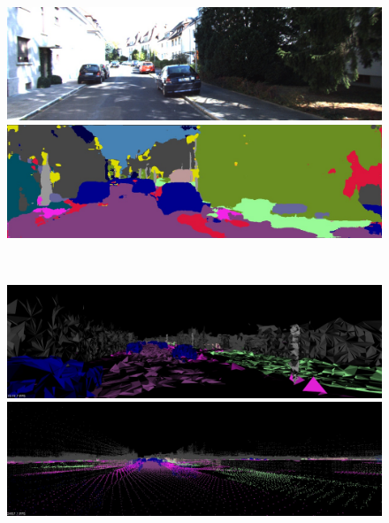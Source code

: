 \begin{figure}[htbp]
 \begin{minipage}[b]{0.50\hsize}
 \begin{center}
  \includegraphics[keepaspectratio, scale=0.18]{./picture/bgrimage/bgrimage1.jpg}
  \end{center}
 \end{minipage}
 \begin{minipage}[b]{0.5\hsize}
 \begin{center}
  \includegraphics[keepaspectratio, scale=0.18]{./picture/segimage/image1.jpg}
  \end{center}
 \end{minipage} \\
 \begin{minipage}[b]{0.50\hsize}
 \begin{center}
  \includegraphics[keepaspectratio, scale=0.18]{./picture/mesh_map_image/image1.jpg}
  \end{center}
 \end{minipage}
 \begin{minipage}[b]{0.50\hsize}
 \begin{center}
  \includegraphics[keepaspectratio, scale=0.18]{./picture/point_map_image/image1.jpg}

\end{center}
\end{minipage}
\end{figure}
